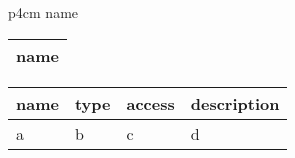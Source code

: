 \documentclass{article}
\begin{document}
\begin{tabular}[t]{p{4cm}}\hline
name \\
\hline
\end{tabular}


\begin{tabularx}{\linewidth}[t]{X}\hline
name \\
\hline
\end{tabularx}

\begin{tabularx}{\linewidth}[t]{lllX}\hline
name & type & access & description\\\hline\hline
a & b & c & d\\
\hline
\end{tabularx}
\end{document}

